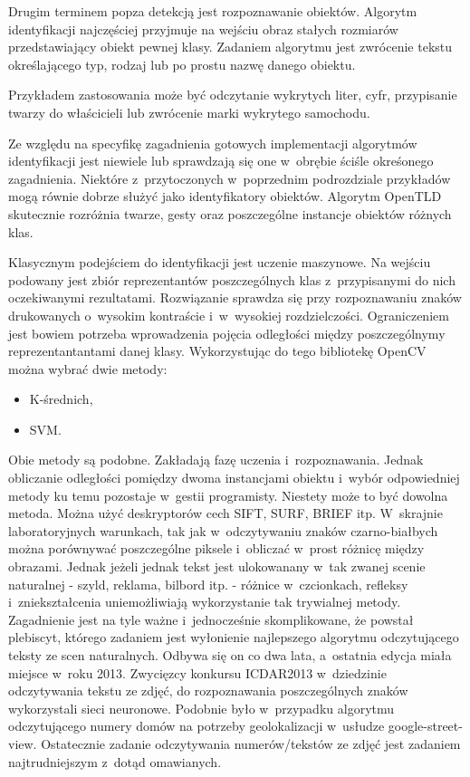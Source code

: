 Drugim terminem popza detekcją jest rozpoznawanie obiektów. Algorytm
identyfikacji najczęściej przyjmuje na wejściu obraz stałych rozmiarów
przedstawiający obiekt pewnej klasy. Zadaniem algorytmu jest zwrócenie
tekstu określającego typ, rodzaj lub po prostu nazwę danego obiektu.

Przykładem zastosowania może być odczytanie wykrytych liter,
cyfr, przypisanie twarzy do właścicieli lub zwrócenie marki wykrytego
samochodu.

Ze względu na specyfikę zagadnienia gotowych implementacji algorytmów
identyfikacji jest niewiele lub sprawdzają się one w~obrębie
ściśle okreśonego zagadnienia. Niektóre z~przytoczonych w~poprzednim
podrozdziale przykładów mogą równie dobrze służyć jako identyfikatory
obiektów. Algorytm OpenTLD skutecznie rozróżnia twarze, gesty oraz
poszczególne instancje obiektów różnych klas.

Klasycznym podejściem do identyfikacji jest uczenie maszynowe. Na
wejściu podowany jest zbiór reprezentantów poszczególnych klas
z~przypisanymi do nich oczekiwanymi rezultatami. Rozwiązanie
sprawdza się przy rozpoznawaniu znaków drukowanych o~wysokim
kontraście i~w~wysokiej rozdzielczości. Ograniczeniem jest bowiem
potrzeba wprowadzenia pojęcia odległości między poszczególnymy
reprezentantantami danej klasy. Wykorzystując do tego bibliotekę
OpenCV można wybrać dwie metody:

\begin{itemize}
\item K-średnich,
\item SVM.
\end{itemize}

Obie metody są podobne. Zakładają fazę uczenia i~rozpoznawania.
Jednak obliczanie odległości pomiędzy dwoma instancjami obiektu
i~wybór odpowiedniej metody ku temu pozostaje w~gestii programisty.
Niestety może to być dowolna metoda. Można użyć deskryptorów cech
SIFT, SURF, BRIEF itp. W~skrajnie laboratoryjnych warunkach, tak
jak w~odczytywaniu znaków czarno-białbych można porównywać poszczególne
piksele i~obliczać w~prost różnicę między obrazami. Jednak
jeżeli jednak tekst jest ulokowanany w~tak zwanej scenie naturalnej -
szyld, reklama, bilbord itp. - różnice w~czcionkach, refleksy
i~zniekształcenia uniemożliwiają wykorzystanie tak trywialnej metody.
Zagadnienie jest na tyle ważne i~jednocześnie skomplikowane, że
powstał plebiscyt, którego zadaniem jest wyłonienie najlepszego
algorytmu odczytującego teksty ze scen naturalnych. Odbywa się
on co dwa lata, a~ostatnia edycja miała miejsce w~roku 2013.
Zwycięzcy konkursu ICDAR2013 w~dziedzinie odczytywania tekstu ze
zdjęć, do rozpoznawania poszczególnych znaków wykorzystali sieci neuronowe.
Podobnie było w~przypadku algorytmu odczytującego numery domów na potrzeby
geolokalizacji w~usłudze google-street-view. Ostatecznie zadanie
odczytywania numerów/tekstów ze zdjęć jest zadaniem najtrudniejszym
z~dotąd omawianych.

